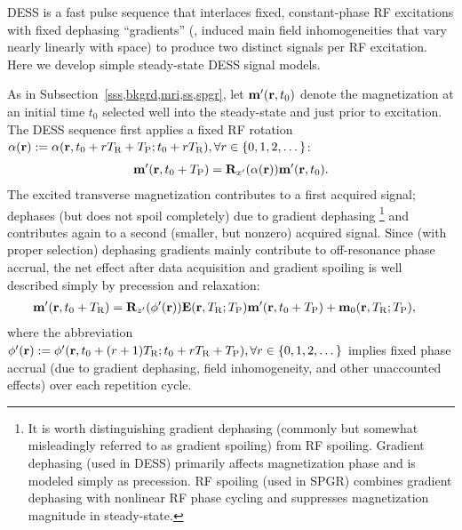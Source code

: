 DESS \cite{redpath:88:fan,bruder:88:ans}
is a fast pulse sequence 
that interlaces fixed, constant-phase RF excitations
with fixed dephasing ``gradients''
(\ie, induced main field inhomogeneities 
that vary nearly linearly with space)
to produce two distinct signals
per RF excitation.
Here we develop simple 
steady-state DESS signal models.

As in Subsection~\ref{sss,bkgrd,mri,ss,spgr},
let $\bmmp\prtz$ denote the magnetization
at an initial time $t_0$ 
selected well into the steady-state
and just prior to excitation.
The DESS sequence first applies
a fixed RF rotation
$\flip\pr := \flip\paren{\bmr,t_0+\rep\TR+\TP;t_0+\rep\TR},
\forall r \in \set{0,1,2,\dots}$:
\begin{align}
	\bmmp\paren{\bmr,t_0+\TP} = \bmRxp{\flip{\pr}} \bmmp\prtz.
	\label{eq:dess-ex}
\end{align}
The excited transverse magnetization
contributes to a first acquired signal;
dephases (but does not spoil completely) 
due to gradient dephasing
\footnote{It is worth distinguishing 
gradient dephasing
(commonly 
but somewhat misleadingly 
referred to as gradient spoiling)
from RF spoiling.
Gradient dephasing
(used in DESS)
primarily affects magnetization phase
and is modeled simply as precession.
RF spoiling
(used in SPGR)
combines gradient dephasing 
with nonlinear RF phase cycling
and suppresses magnetization magnitude 
in steady-state.
}
and contributes again to a second 
(smaller, but nonzero) acquired signal.
Since (with proper selection) 
dephasing gradients mainly contribute 
to off-resonance phase accrual,
the net effect
after data acquisition
and gradient spoiling
is well described 
simply by precession and relaxation:
\begin{align}
	\bmmp\paren{\bmr,t_0+\TR} &= 
	\bmRzp{\php\paren{\bmr}} \bmE\paren{\bmr,\TR;\TP} \bmmp\paren{\bmr,t_0+\TP} +
	\bmmzero\paren{\bmr,\TR;\TP},
	\label{eq:dess-pr}
\end{align}
where the abbreviation
$\php\pr := \php\paren{\bmr,t_0+\paren{\rep+1}\TR;t_0+\rep\TR+\TP},
\forall \rep \in \set{0,1,2,\dots}$
implies fixed phase accrual 
(due to gradient dephasing, 
field inhomogeneity, 
and other unaccounted effects)
over each repetition cycle.

